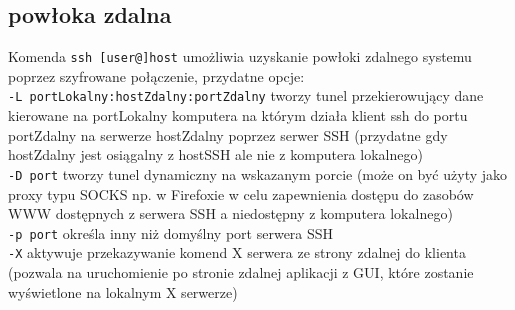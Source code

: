 \documentclass{pdfBooklets}
\begin{document}
\subsection{powłoka zdalna}
Komenda
\texttt{ssh [user@]host}
umożliwia uzyskanie powłoki zdalnego systemu poprzez szyfrowane połączenie, przydatne opcje:\\
	\texttt{-L portLokalny:hostZdalny:portZdalny} tworzy tunel przekierowujący dane kierowane na portLokalny komputera na którym działa klient ssh do portu portZdalny na serwerze hostZdalny poprzez serwer SSH (przydatne gdy hostZdalny jest osiągalny z hostSSH ale nie z komputera lokalnego)\\
	\texttt{-D port} tworzy tunel dynamiczny na wskazanym porcie (może on być użyty jako proxy typu SOCKS np. w Firefoxie w celu zapewnienia dostępu do zasobów WWW dostępnych z serwera SSH a niedostępny z komputera lokalnego)\\
	\texttt{-p port} określa inny niż domyślny port serwera SSH\\
	\texttt{-X} aktywuje przekazywanie komend X serwera ze strony zdalnej do klienta (pozwala na uruchomienie po stronie zdalnej aplikacji z GUI, które zostanie wyświetlone na lokalnym X serwerze)

\end{document}
